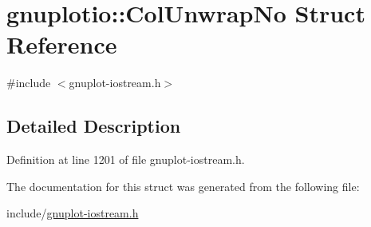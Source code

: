 \hypertarget{structgnuplotio_1_1_col_unwrap_no}{}\section{gnuplotio\+:\+:Col\+Unwrap\+No Struct Reference}
\label{structgnuplotio_1_1_col_unwrap_no}


{\ttfamily \#include $<$gnuplot-\/iostream.\+h$>$}



\subsection{Detailed Description}


Definition at line 1201 of file gnuplot-\/iostream.\+h.



The documentation for this struct was generated from the following file\+:\begin{DoxyCompactItemize}
\item 
include/\hyperlink{gnuplot-iostream_8h}{gnuplot-\/iostream.\+h}\end{DoxyCompactItemize}
